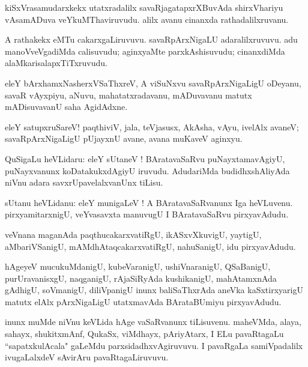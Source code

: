 \documentclass{article}
\begin{document}
\begin{mn}
kiSxVrasamudarxkekx utatxradalilx savaRjagatapxrXBuvAda shirxVhariyu vAsamADuva veYkuMThaviruvudu.
alilx avanu cinanxda rathadalilxruvanu.
\end{mn}

\begin{mn}
A rathakekx eMTu cakarxgaLiruvuvu. savaRpArxNigaLU adaralilxruvuvu. 
adu manoVveVgadiMda calisuvudu; aginxyaMte parxkAshisuvudu; cinanxdiMda alaMkarisalapxTiTxruvudu.
\end{mn}

\begin{mn}
eleY bArxhamxNasherxVSaThxreV, A viSuNxvu savaRpArxNigaLigU oDeyanu, savaR vAyxpiyu,
aNuvu, mahatatxradavanu, mADuvavanu matutx mADisuvavanU saha AgidAdxne.
\end{mn}

\begin{mn}
eleY satupxruSareV! paqthiviV, jala, teVjasusx, AkAsha, vAyu, ivelAlx avaneV; 
savaRpArxNigaLigU pUjayxnU avane, avana muKaveV aginxyu.
\end{mn}


\begin{mn}
QuSigaLu heVLidaru: eleY sUtaneV ! BAratavaSaRvu puNayxtamavAgiyU, 
puNayxvanunx koDatakukxdAgiyU iruvudu. AdudariMda budidhxshAliyAda niVnu adara 
savxrUpavelalxvanUnx tiLisu.
\end{mn}

\begin{mn}
sUtanu heVLidanu: eleY munigaLeV ! A BAratavaSaRvanunx Iga heVLuvenu. pirxyamitarxnigU, 
veYvasavxta manuvugU I BAratavaSaRvu pirxyavAdudu.
\end{mn}

\begin{mn}
veVnana maganAda paqthucakarxvatiRgU, ikASxvXkuvigU,
yaytigU, aMbariVSanigU, mAMdhAtaqcakarxvatiRgU, nahuSanigU, idu pirxyavAdudu.
\end{mn}

\begin{mn}
hAgeyeV mucukuMdanigU, kubeVaranigU, ushiVnaranigU, QSaBanigU, purUravanisxgU, naqganigU,
rAjaSiRyAda kushikanigU, mahAtamxnAda gAdhigU, soVmanigU, diliVpanigU inunx 
baliSaThxrAda aneVka kaSxtirxyarigU matutx elAlx pArxNigaLigU utatxmavAda BArataBUmiyu pirxyavAdudu.
\end{mn}

\begin{mn}
inunx muMde niVnu keVLida hAge vaSaRvanunx tiLisuvenu. maheVMda, alaya, sahayx,
shukitxmAnf, QukaSx, viMdhayx, pAriyAtarx, I ELu pavaRtagaLu ``sapatxkulAcala" gaLeMdu
parxsidadhxvAgiruvuvu. I pavaRgaLa samiVpadalilx ivugaLalxdeV sAvirAru pavaRtagaLiruvuvu.
\end{mn}
\end{document}
